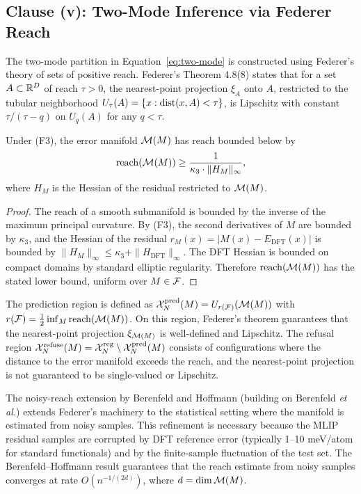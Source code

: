 \subsection{Clause (v): Two-Mode Inference via Federer Reach}
\label{sec:proof-v}

The two-mode partition in Equation~\eqref{eq:two-mode} is constructed using Federer's theory of sets of positive reach\cite{federer1959curvature}. Federer's Theorem 4.8(8) states that for a set $A \subset \mathbb{R}^D$ of reach $\tau > 0$, the nearest-point projection $\xi_A$ onto $A$, restricted to the tubular neighborhood $U_\tau(A) = \{x : \mathrm{dist}(x,A) < \tau\}$, is Lipschitz with constant $\tau / (\tau - q)$ on $U_q(A)$ for any $q < \tau$.

\begin{lemma}\label{lem:reach}
Under (F3), the error manifold $\mathcal{M}(M)$ has reach bounded below by
\begin{equation}\label{eq:reach-bound}
    \mathrm{reach}(\mathcal{M}(M)) \geq \frac{1}{\kappa_3 \cdot \|H_M\|_{\infty}},
\end{equation}
where $H_M$ is the Hessian of the residual restricted to $\mathcal{M}(M)$.
\end{lemma}

\begin{proof}
The reach of a smooth submanifold is bounded by the inverse of the maximum principal curvature. By (F3), the second derivatives of $M$ are bounded by $\kappa_3$, and the Hessian of the residual $r_M(x) = |M(x) - E_{\text{DFT}}(x)|$ is bounded by $\|H_M\|_{\infty} \leq \kappa_3 + \|H_{\text{DFT}}\|_{\infty}$. The DFT Hessian is bounded on compact domains by standard elliptic regularity. Therefore $\mathrm{reach}(\mathcal{M}(M))$ has the stated lower bound, uniform over $M \in \mathcal{F}$.
\end{proof}

The prediction region is defined as $\mathcal{X}_N^{\text{pred}}(M) = U_{r(\mathcal{F})}(\mathcal{M}(M))$ with $r(\mathcal{F}) = \frac{1}{2} \inf_M \mathrm{reach}(\mathcal{M}(M))$. On this region, Federer's theorem guarantees that the nearest-point projection $\xi_{\mathcal{M}(M)}$ is well-defined and Lipschitz. The refusal region $\mathcal{X}_N^{\text{refuse}}(M) = \mathcal{X}_N^{\text{reg}} \setminus \mathcal{X}_N^{\text{pred}}(M)$ consists of configurations where the distance to the error manifold exceeds the reach, and the nearest-point projection is not guaranteed to be single-valued or Lipschitz.

The noisy-reach extension by Berenfeld and Hoffmann\cite{berenfeld2022estimating} (building on Berenfeld \emph{et al.}\cite{berenfeld2022estimating}) extends Federer's machinery to the statistical setting where the manifold is estimated from noisy samples. This refinement is necessary because the MLIP residual samples are corrupted by DFT reference error (typically 1--10 meV/atom for standard functionals) and by the finite-sample fluctuation of the test set. The Berenfeld--Hoffmann result guarantees that the reach estimate from noisy samples converges at rate $O(n^{-1/(2d)})$, where $d = \dim \mathcal{M}(M)$.

